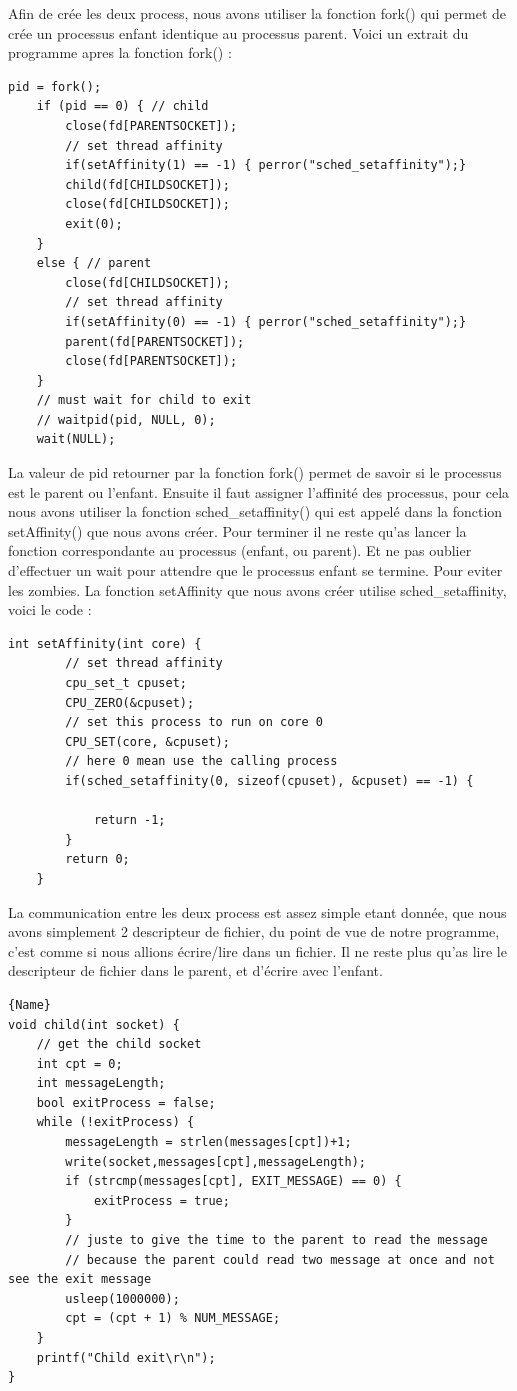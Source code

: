 \documentclass[
	a4paper, %
	10pt, %
]{CSUniSchoolLabReport}
\begin{document}
Afin de crée les deux process, nous avons utiliser la fonction fork() qui permet de crée un processus enfant identique au processus parent.
Voici un extrait du programme apres la fonction fork() :
\begin{lstlisting}[style=CStyle]
	pid = fork();
    if (pid == 0) { // child 
        close(fd[PARENTSOCKET]); 
        // set thread affinity
        if(setAffinity(1) == -1) { perror("sched_setaffinity");}
        child(fd[CHILDSOCKET]);
        close(fd[CHILDSOCKET]);
        exit(0);
    }
    else { // parent 
        close(fd[CHILDSOCKET]);
        // set thread affinity
        if(setAffinity(0) == -1) { perror("sched_setaffinity");}
        parent(fd[PARENTSOCKET]);
        close(fd[PARENTSOCKET]);
    }
    // must wait for child to exit
    // waitpid(pid, NULL, 0);
    wait(NULL);
\end{lstlisting}
La valeur de pid retourner par la fonction fork() permet de savoir si le processus est le parent ou l'enfant.
Ensuite il faut assigner l'affinité des processus, pour cela nous avons utiliser la fonction sched\_setaffinity() qui est appelé dans la fonction setAffinity() que nous avons créer.
Pour terminer il ne reste qu'as lancer la fonction correspondante au processus (enfant, ou parent).
Et ne pas oublier d'effectuer un wait pour attendre que le processus enfant se termine. Pour eviter les zombies.
La fonction setAffinity que nous avons créer utilise sched\_setaffinity, voici le code : \\
\begin{lstlisting}[style=CStyle]
	int setAffinity(int core) {
		// set thread affinity
		cpu_set_t cpuset;
		CPU_ZERO(&cpuset);
		// set this process to run on core 0
		CPU_SET(core, &cpuset);
		// here 0 mean use the calling process
		if(sched_setaffinity(0, sizeof(cpuset), &cpuset) == -1) {
	
			return -1;
		}
		return 0;
	}
\end{lstlisting}
La communication entre les deux process est assez simple etant donnée, que nous avons simplement 2 descripteur de fichier, du point de vue de notre programme, c'est comme si nous allions écrire/lire dans un fichier.
Il ne reste plus qu'as lire le descripteur de fichier dans le parent, et d'écrire avec l'enfant.\\
\noindent\begin{minipage}{.50\textwidth}
\begin{lstlisting}[style=CStyle, caption=Processus Enfant]{Name}
void child(int socket) {
	// get the child socket
	int cpt = 0;
	int messageLength;
	bool exitProcess = false;
	while (!exitProcess) {
		messageLength = strlen(messages[cpt])+1;
		write(socket,messages[cpt],messageLength);
		if (strcmp(messages[cpt], EXIT_MESSAGE) == 0) {
			exitProcess = true;
		}
		// juste to give the time to the parent to read the message
		// because the parent could read two message at once and not see the exit message
		usleep(1000000); 
		cpt = (cpt + 1) % NUM_MESSAGE;
	}
	printf("Child exit\r\n");
}
\end{lstlisting}
\end{minipage}\hfill
\end{document}

